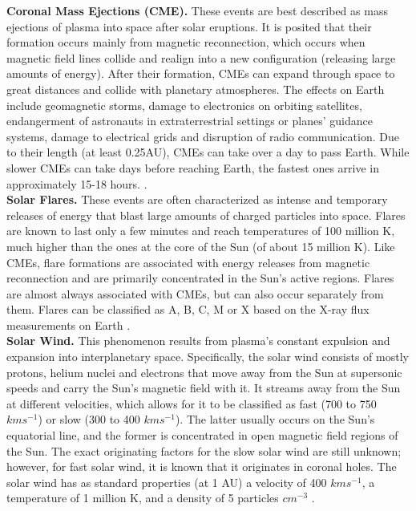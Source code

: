 \noindent\textbf{Coronal Mass Ejections (CME).} These events are best described as mass ejections of plasma into space after solar eruptions. It is posited that their formation occurs mainly from magnetic reconnection, which occurs when magnetic field lines collide and realign into a new configuration (releasing large amounts of energy). After their formation, CMEs can expand through space to great distances and collide with planetary atmospheres. The effects on Earth include geomagnetic storms, damage to electronics on orbiting satellites, endangerment of astronauts in extraterrestrial settings or planes' guidance systems, damage to electrical grids and disruption of radio communication. Due to their length (at least 0.25AU), CMEs can take over a day to pass Earth. While slower CMEs can take days before reaching Earth, the fastest ones arrive in approximately 15-18 hours. \cite{priest_2014, moldwin_2008}.\\

\noindent\textbf{Solar Flares.} These events are often characterized as intense and temporary releases of energy that blast large amounts of charged particles into space. Flares are known to last only a few minutes and reach temperatures of 100 million K, much higher than the ones at the core of the Sun (of about 15 million K). Like CMEs, flare formations are associated with energy releases from magnetic reconnection and are primarily concentrated in the Sun's active regions. Flares are almost always associated with CMEs, but can also occur separately from them. Flares can be classified as A, B, C, M or X based on the X-ray flux measurements on Earth \cite{moldwin_2008, priest_2014}.\\

\noindent\textbf{Solar Wind.} This phenomenon results from plasma's constant expulsion and expansion into interplanetary space. Specifically, the solar wind consists of mostly protons, helium nuclei and electrons that move away from the Sun at supersonic speeds and carry the Sun's magnetic field with it. It streams away from the Sun at different velocities, which allows for it to be classified as fast (700 to 750 $km s^{-1}$) or slow (300 to 400 $km s^{-1}$). The latter usually occurs on the Sun's equatorial line, and the former is concentrated in open magnetic field regions of the Sun. The exact originating factors for the slow solar wind are still unknown; however, for fast solar wind, it is known that it originates in coronal holes. The solar wind has as standard properties (at 1 AU) a velocity of 400 $km s^{-1}$, a temperature of 1 million K, and a density of 5 particles $cm^{-3}$ \cite{moldwin_2008, priest_2014}.

